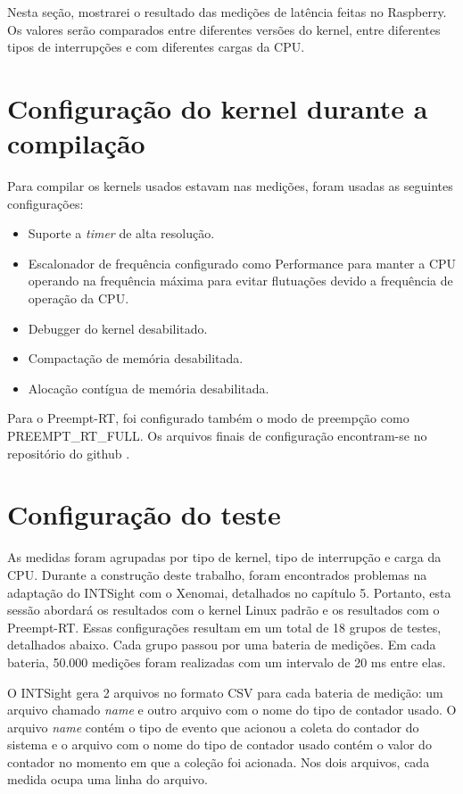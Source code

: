 
Nesta seção, mostrarei o resultado das medições de latência feitas no Raspberry. Os valores serão comparados entre diferentes versões do kernel, entre diferentes tipos de interrupções e com diferentes cargas da CPU.

\section{Configuração do kernel durante a compilação}

Para compilar os kernels usados estavam nas medições, foram usadas as seguintes configurações:

\begin{itemize}
    \item Suporte a \textit{timer} de alta resolução.
    \item Escalonador de frequência configurado como Performance para manter a CPU operando na frequência máxima para evitar flutuações devido a frequência de operação da CPU.
    \item Debugger do kernel desabilitado.
    \item Compactação de memória desabilitada.
    \item Alocação contígua de memória desabilitada.
\end{itemize}

Para o Preempt-RT, foi configurado também o modo de preempção como PREEMPT\_RT\_FULL. Os arquivos finais de configuração encontram-se no repositório do github \cite{Taian2019}.

\section{Configuração do teste}

As medidas foram agrupadas por tipo de kernel, tipo de interrupção e carga da CPU. Durante a construção deste trabalho, foram encontrados problemas na adaptação do INTSight com o Xenomai, detalhados no capítulo 5. Portanto, esta sessão abordará os resultados com o kernel Linux padrão e os resultados com o Preempt-RT. Essas configurações resultam em um total de 18 grupos de testes, detalhados abaixo. Cada grupo passou por uma bateria de medições. Em cada bateria, 50.000 medições foram realizadas com um intervalo de 20 ms entre elas.

O INTSight gera 2 arquivos no formato CSV para cada bateria de medição: um arquivo chamado \textit{name} e outro arquivo com o nome do tipo de contador usado. O arquivo \textit{name} contém o tipo de evento que acionou a coleta do contador do sistema e o arquivo com o nome do tipo de contador usado contém o valor do contador no momento em que a coleção foi acionada. Nos dois arquivos, cada medida ocupa uma linha do arquivo.

